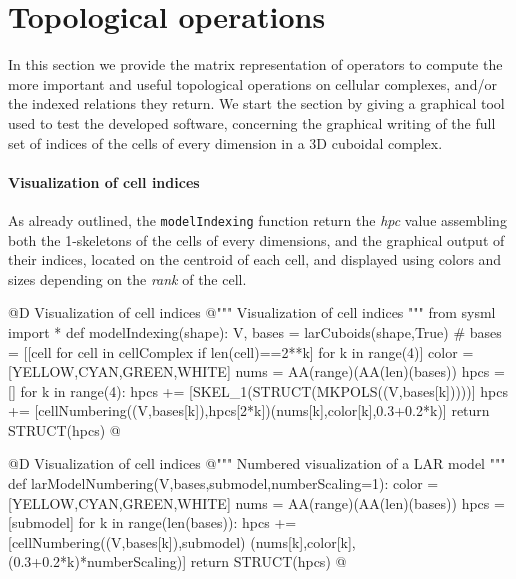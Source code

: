 \documentclass[11pt,oneside]{article}	%
\begin{document}
\section{Topological operations}

In this section we provide the matrix representation of operators to compute the more important and useful topological operations on cellular complexes, and/or the indexed relations they return. We start the section by giving a graphical tool used to test the developed software, concerning the graphical writing of the full set of indices of the cells of every dimension in a 3D cuboidal complex.  

\paragraph{Visualization of cell indices}
As already outlined, the \texttt{modelIndexing} function return the \emph{hpc} value assembling both the 1-skeletons of the cells of every dimensions, and the graphical output of their indices, located on the centroid of each cell, and displayed using colors and sizes depending on the \emph{rank} of the cell.

@D Visualization of cell indices
@{""" Visualization of cell indices """
from sysml import *
def modelIndexing(shape):
	V, bases = larCuboids(shape,True)
	# bases = [[cell for cell in cellComplex if len(cell)==2**k] for k in range(4)]
	color = [YELLOW,CYAN,GREEN,WHITE]
	nums = AA(range)(AA(len)(bases))
	hpcs = []
	for k in range(4):
		hpcs += [SKEL_1(STRUCT(MKPOLS((V,bases[k]))))]
		hpcs += [cellNumbering((V,bases[k]),hpcs[2*k])(nums[k],color[k],0.3+0.2*k)]
	return STRUCT(hpcs)
@}


@D Visualization of cell indices
@{""" Numbered visualization of a LAR model """
def larModelNumbering(V,bases,submodel,numberScaling=1):
	color = [YELLOW,CYAN,GREEN,WHITE]
	nums = AA(range)(AA(len)(bases))
	hpcs = [submodel]
	for k in range(len(bases)):
		hpcs += [cellNumbering((V,bases[k]),submodel)
					(nums[k],color[k],(0.3+0.2*k)*numberScaling)]
	return STRUCT(hpcs)
@}
\end{document}
